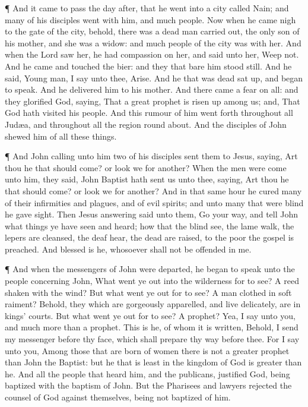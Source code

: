  ¶ And it came to pass the day after, that he went into a
city called Nain; and many of his disciples went with him, and much
people.  Now when he came nigh to the gate of the city,
behold, there was a dead man carried out, the only son of his mother,
and she was a widow: and much people of the city was with her.
 And when the Lord saw her, he had compassion on her, and
said unto her, Weep not.  And he came and touched the bier:
and they that bare him stood still. And he said, Young man, I say unto
thee, Arise.  And he that was dead sat up, and began to
speak. And he delivered him to his mother.  And there came
a fear on all: and they glorified God, saying, That a great prophet is
risen up among us; and, That God hath visited his people. 
And this rumour of him went forth throughout all Judæa, and throughout
all the region round about.  And the disciples of John
shewed him of all these things.

 ¶ And John calling unto him two of his disciples sent them
to Jesus, saying, Art thou he that should come? or look we for another?
 When the men were come unto him, they said, John Baptist
hath sent us unto thee, saying, Art thou he that should come? or look we
for another?  And in that same hour he cured many of their
infirmities and plagues, and of evil spirits; and unto many that were
blind he gave sight.  Then Jesus answering said unto them,
Go your way, and tell John what things ye have seen and heard; how that
the blind see, the lame walk, the lepers are cleansed, the deaf hear,
the dead are raised, to the poor the gospel is preached. 
And blessed is he, whosoever shall not be offended in me.

 ¶ And when the messengers of John were departed, he began
to speak unto the people concerning John, What went ye out into the
wilderness for to see? A reed shaken with the wind?  But
what went ye out for to see? A man clothed in soft raiment? Behold, they
which are gorgeously apparelled, and live delicately, are in kings'
courts.  But what went ye out for to see? A prophet? Yea, I
say unto you, and much more than a prophet.  This is he, of
whom it is written, Behold, I send my messenger before thy face, which
shall prepare thy way before thee.  For I say unto you,
Among those that are born of women there is not a greater prophet than
John the Baptist: but he that is least in the kingdom of God is greater
than he.  And all the people that heard him, and the
publicans, justified God, being baptized with the baptism of John.
 But the Pharisees and lawyers rejected the counsel of God
against themselves, being not baptized of him.

